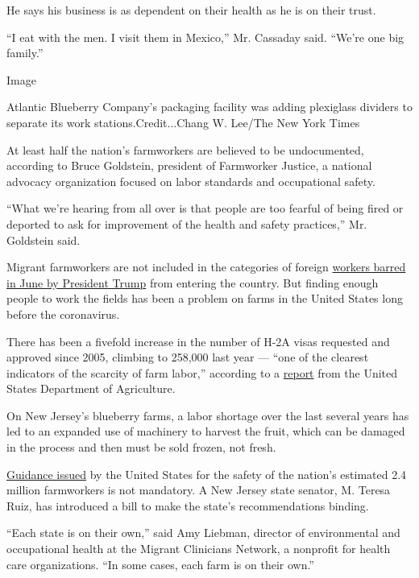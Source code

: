 He says his business is as dependent on their health as he is on their
trust.

``I eat with the men. I visit them in Mexico,'' Mr. Cassaday said.
``We're one big family.''

Image

Atlantic Blueberry Company's packaging facility was adding plexiglass
dividers to separate its work stations.Credit...Chang W. Lee/The New
York Times

At least half the nation's farmworkers are believed to be undocumented,
according to Bruce Goldstein, president of Farmworker Justice, a
national advocacy organization focused on labor standards and
occupational safety.

``What we're hearing from all over is that people are too fearful of
being fired or deported to ask for improvement of the health and safety
practices,'' Mr. Goldstein said.

Migrant farmworkers are not included in the categories of foreign
\href{https://www.nytimes3xbfgragh.onion/2020/06/22/us/politics/trump-h1b-work-visas.html}{workers
barred in June by President Trump} from entering the country. But
finding enough people to work the fields has been a problem on farms in
the United States long before the coronavirus.

There has been a fivefold increase in the number of H-2A visas requested
and approved since 2005, climbing to 258,000 last year --- ``one of the
clearest indicators of the scarcity of farm labor,'' according to a
\href{https://www.ers.usda.gov/topics/farm-economy/farm-labor/\#size}{report}
from the United States Department of Agriculture.

On New Jersey's blueberry farms, a labor shortage over the last several
years has led to an expanded use of machinery to harvest the fruit,
which can be damaged in the process and then must be sold frozen, not
fresh.

\href{https://www.cdc.gov/coronavirus/2019-ncov/community/guidance-agricultural-workers.html}{Guidance
issued} by the United States for the safety of the nation's estimated
2.4 million farmworkers is not mandatory. A New Jersey state senator, M.
Teresa Ruiz, has introduced a bill to make the state's recommendations
binding.

``Each state is on their own,'' said Amy Liebman, director of
environmental and occupational health at the Migrant Clinicians Network,
a nonprofit for health care organizations. ``In some cases, each farm is
on their own.''

